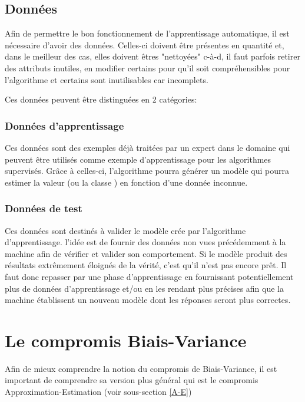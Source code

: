 \documentclass[a4paper]{article}
\begin{document}
\newpage

\subsection{Données}
\label{Data}
Afin de permettre le bon fonctionnement de l'apprentissage automatique, il est nécessaire d'avoir des données. Celles-ci doivent être présentes en quantité et, dans le meilleur des cas, elles doivent êtres "nettoyées" c-à-d, il faut parfois retirer des attributs inutiles, en modifier certains pour qu'il soit compréhensibles pour l'algorithme et certains sont inutilisables car incomplets. \newline

Ces données peuvent être distinguées en 2 catégories:

\subsubsection{Données d'apprentissage}
Ces données sont des exemples déjà traitées par un expert dans le domaine qui peuvent être utilisés comme exemple d'apprentissage pour les algorithmes supervisés. Grâce à celles-ci, l'algorithme pourra générer un modèle qui pourra estimer la valeur (ou la classe ) en fonction d'une donnée inconnue.

\subsubsection{Données de test}
Ces données sont destinés à valider le modèle crée par l'algorithme d'apprentissage. l'idée est de fournir des données non vues précédemment à la machine afin de vérifier et valider son comportement. Si le modèle produit des résultats extrêmement éloignés de la vérité, c'est qu'il n'est pas encore prêt. Il faut donc repasser par une phase d'apprentissage en fournissant potentiellement plus de données d'apprentissage et/ou en les rendant plus précises afin que la machine établissent un nouveau modèle dont les réponses seront plus correctes.

\newpage

\section{Le compromis Biais-Variance}
\label{B-V}

Afin de mieux comprendre la notion du compromis de Biais-Variance, il est important de comprendre sa version plus général qui est le compromis Approximation-Estimation (voir sous-section \ref{A-E})
\end{document}
